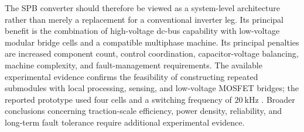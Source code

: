 The SPB converter should therefore be viewed as a system-level architecture rather than merely a replacement for a conventional inverter leg. Its principal benefit is the combination of high-voltage dc-bus capability with low-voltage modular bridge cells and a compatible multiphase machine. Its principal penalties are increased component count, control coordination, capacitor-voltage balancing, machine complexity, and fault-management requirements. The available experimental evidence confirms the feasibility of constructing repeated submodules with local processing, sensing, and low-voltage MOSFET bridges; the reported prototype used four cells and a switching frequency of \(20~\mathrm{kHz}\) \cite{Jin2017}. Broader conclusions concerning traction-scale efficiency, power density, reliability, and long-term fault tolerance require additional experimental evidence. %